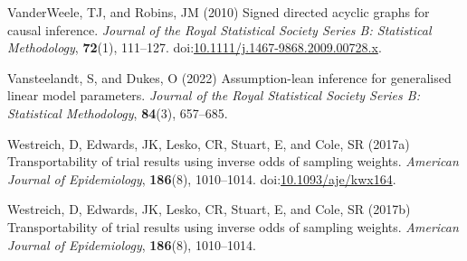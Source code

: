 \documentclass[
  single column]{article}
\newlength{\cslhangindent}
\newenvironment{CSLReferences}[2] %
 {\begin{list}{}{%
  \setlength{\itemindent}{0pt}
  \setlength{\leftmargin}{0pt}
  \setlength{\parsep}{0pt}
  \ifodd #1
   \setlength{\leftmargin}{\cslhangindent}
   \setlength{\itemindent}{-1\cslhangindent}
  \fi
  \setlength{\itemsep}{#2\baselineskip}}}
 {\end{list}}
\begin{document}
\begin{CSLReferences}{1}{0}
VanderWeele, TJ, and Robins, JM (2010) Signed directed acyclic graphs
for causal inference. \emph{Journal of the Royal Statistical Society
Series B: Statistical Methodology}, \textbf{72}(1), 111--127.
doi:\href{https://doi.org/10.1111/j.1467-9868.2009.00728.x}{10.1111/j.1467-9868.2009.00728.x}.

Vansteelandt, S, and Dukes, O (2022) Assumption-lean inference for
generalised linear model parameters. \emph{Journal of the Royal
Statistical Society Series B: Statistical Methodology}, \textbf{84}(3),
657--685.

Westreich, D, Edwards, JK, Lesko, CR, Stuart, E, and Cole, SR (2017a)
Transportability of trial results using inverse odds of sampling
weights. \emph{American Journal of Epidemiology}, \textbf{186}(8),
1010--1014.
doi:\href{https://doi.org/10.1093/aje/kwx164}{10.1093/aje/kwx164}.

Westreich, D, Edwards, JK, Lesko, CR, Stuart, E, and Cole, SR (2017b)
Transportability of trial results using inverse odds of sampling
weights. \emph{American Journal of Epidemiology}, \textbf{186}(8),
1010--1014.

\end{CSLReferences}
\end{document}
